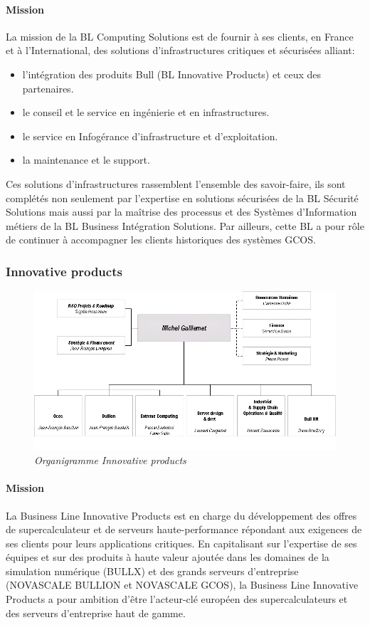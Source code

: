 \documentclass[11pt]{article}
\begin{document}
		\paragraph{Mission}
		La mission de la BL Computing Solutions est de fournir à ses clients, en France et à l’International, 
		des solutions d’infrastructures critiques et sécurisées alliant:
		\begin{itemize}
		\item l’intégration des produits Bull (BL Innovative Products) et ceux des partenaires.
		\item le conseil et le service en ingénierie et en infrastructures.
		\item le service en Infogérance d'infrastructure et d'exploitation.
		\item la maintenance et le support.
		\end{itemize}
		Ces solutions d’infrastructures rassemblent l’ensemble des savoir-faire, ils sont complétés non seulement par l’expertise en solutions 
		sécurisées de la BL Sécurité Solutions mais aussi par la maîtrise des processus et des Systèmes 
		d’Information métiers de la BL Business Intégration Solutions. \newline
		Par ailleurs, cette BL a pour rôle de continuer à accompagner les clients historiques des systèmes GCOS.
		\newpage
		\subsubsection{Innovative products}
		\begin{figure}[!h]
		\centering \includegraphics[scale=0.4]{orga_innoprod.png}
		\caption{\it Organigramme Innovative products}
		\end{figure}
		\paragraph{Mission}
		La Business Line Innovative Products est en charge du développement des offres de 
		supercalculateur et de serveurs haute-performance répondant aux exigences de ses clients pour 
		leurs applications critiques. \newline
		En capitalisant sur l’expertise de ses équipes et sur des produits à haute valeur ajoutée dans les 
		domaines de la simulation numérique (BULLX) et des grands serveurs d’entreprise (NOVASCALE 
		BULLION et NOVASCALE GCOS), la Business Line Innovative Products a pour ambition d’être 
		l’acteur-clé européen des supercalculateurs et des serveurs d’entreprise haut de gamme.
\end{document}
